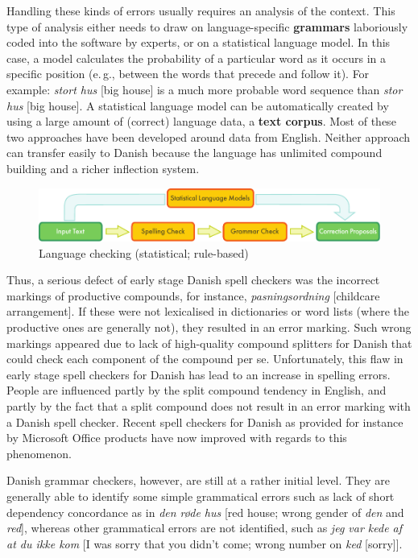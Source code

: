 \documentclass[]{../../metanetpaper}
\begin{document}
\begin{multicols}{2}
Handling these kinds of errors usually requires an analysis of the context. 
This type of analysis either needs to draw on language-specific \textbf{grammars} laboriously coded into the software by experts, or on a statistical language model. In this case, a model calculates the probability of a particular word as it occurs in a specific position (e.\,g., between the words that precede and follow it). For example: \textit{stort hus} [big house] is a much more probable word sequence than \textit{stor hus} [big house]. A statistical language model can be automatically created by using a large amount of (correct) language data, a \textbf{text corpus}. Most of these two approaches have been developed around data from English. Neither approach can transfer easily to Danish because the language has unlimited compound building and a richer inflection system.
\begin{figure}[htb]
  \center
  \includegraphics[width=\textwidth]{../_media/english/language_checking}
  \caption{Language checking (statistical; rule-based)}
  \label{fig:langcheckingaarch_en}
\end{figure}
Thus, a serious defect of early stage Danish spell checkers was the incorrect markings of productive compounds, for instance, {\it pasningsordning} [childcare arrangement]. If these were not lexicalised in dictionaries or word lists (where the productive ones are generally not), they resulted in an error marking. Such wrong markings appeared due to lack of high-quality compound splitters for Danish that could check each component of the compound per se. Unfortunately, this flaw in early stage spell checkers for Danish has lead to an increase in spelling errors. People are influenced partly by the split compound tendency in English, and partly by the fact that a split compound does not result in an error marking with a Danish spell checker. Recent spell checkers for Danish as provided for instance by Microsoft Office products have now improved with regards to this phenomenon. 

Danish grammar checkers, however, are still at a rather initial level. They are generally able to identify some simple grammatical errors such as lack of short dependency concordance as in {\it *den r\o de hus} [red house; wrong gender of {\it den} and {\it red}], whereas other grammatical errors are not identified, such as {\it *jeg var kede af at du ikke kom} [I was sorry that you didn't come; wrong number on {\it ked} [sorry]]. 


\end{multicols}
\end{document}
